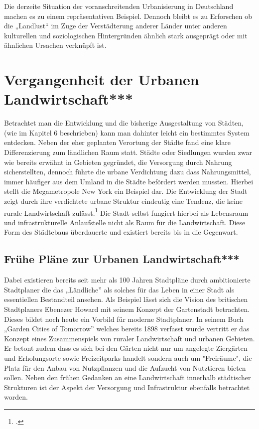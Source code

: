 \documentclass{scrartcl}
\begin{document}
Die derzeite Situation der voranschreitenden Urbanisierung in Deutschland machen es zu einem repräsentativen Beispiel. Dennoch bleibt es zu Erforschen ob die „Landlust“ im Zuge der Verstädterung anderer Länder unter anderen kulturellen und soziologischen Hintergründen ähnlich stark ausgeprägt oder mit ähnlichen Ursachen verknüpft ist.

\section{Vergangenheit der Urbanen Landwirtschaft***}

Betrachtet man die Entwicklung und die bisherige Ausgestaltung von Städten, (wie im Kapitel 6 beschrieben) kann man dahinter leicht ein bestimmtes System entdecken. Neben der eher geplanten Verortung der Städte fand eine klare Differenzierung zum ländlichen Raum statt. Städte oder Siedlungen wurden zwar wie bereits erwähnt in Gebieten gegründet, die Versorgung durch Nahrung sicherstellten, dennoch führte die urbane Verdichtung dazu dass Nahrungsmittel, immer häufiger aus dem Umland in die Städte befördert werden mussten. Hierbei stellt die Megametropole New York ein Beispiel dar. Die Entwicklung der Stadt zeigt durch ihre verdichtete urbane Struktur eindeutig eine Tendenz, die keine rurale Landwirtschaft zulässt.\footcite[Vgl.][S. 146]{} Die Stadt selbst fungiert hierbei als Lebensraum und infrastrukturelle Anlaufstelle nicht als Raum für die Landwirtschaft. Diese Form des Städtebaus überdauerte und existiert bereits bis in die Gegenwart.

\subsection{Frühe Pläne zur Urbanen Landwirtschaft***}
Dabei existieren bereits seit mehr als 100 Jahren Stadtpläne durch ambitionierte Stadtplaner die das „Ländliche” als solches für das Leben in einer Stadt als essentiellen Bestandteil ansehen. Als Beispiel lässt sich die Vision des britischen Stadtplaners Ebenezer Howard mit seinem Konzept der Gartenstadt betrachten. Dieses bildet noch heute ein Vorbild für moderne Stadtplaner. In seinem Buch „Garden Cities of Tomorrow” welches bereits 1898 verfasst wurde vertritt er das Konzept eines Zusammenspiels von ruraler Landwirtschaft und urbanen Gebieten. Er betont zudem dass es sich bei den Gärten nicht nur um angelegte Ziergärten und Erholungsorte sowie Freizeitparks handelt sondern auch um "Freiräume", die Platz für den Anbau von Nutzpflanzen und die Aufzucht von Nutztieren bieten sollen. Neben den frühen Gedanken an eine Landwirtschaft innerhalb städtischer Strukturen ist der Aspekt der Versorgung und Infrastruktur ebenfalls betrachtet worden.
\end{document}

